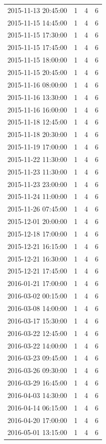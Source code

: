 \begin{tabular}{lrrr}
2015-11-13 20:45:00 & 1 & 4 & 6 \\
2015-11-15 14:45:00 & 1 & 4 & 6 \\
2015-11-15 17:30:00 & 1 & 4 & 6 \\
2015-11-15 17:45:00 & 1 & 4 & 6 \\
2015-11-15 18:00:00 & 1 & 4 & 6 \\
2015-11-15 20:45:00 & 1 & 4 & 6 \\
2015-11-16 08:00:00 & 1 & 4 & 6 \\
2015-11-16 13:30:00 & 1 & 4 & 6 \\
2015-11-16 16:00:00 & 1 & 4 & 6 \\
2015-11-18 12:45:00 & 1 & 4 & 6 \\
2015-11-18 20:30:00 & 1 & 4 & 6 \\
2015-11-19 17:00:00 & 1 & 4 & 6 \\
2015-11-22 11:30:00 & 1 & 4 & 6 \\
2015-11-23 11:30:00 & 1 & 4 & 6 \\
2015-11-23 23:00:00 & 1 & 4 & 6 \\
2015-11-24 11:00:00 & 1 & 4 & 6 \\
2015-11-26 07:45:00 & 1 & 4 & 6 \\
2015-12-01 20:00:00 & 1 & 4 & 6 \\
2015-12-18 17:00:00 & 1 & 4 & 6 \\
2015-12-21 16:15:00 & 1 & 4 & 6 \\
2015-12-21 16:30:00 & 1 & 4 & 6 \\
2015-12-21 17:45:00 & 1 & 4 & 6 \\
2016-01-21 17:00:00 & 1 & 4 & 6 \\
2016-03-02 00:15:00 & 1 & 4 & 6 \\
2016-03-08 14:00:00 & 1 & 4 & 6 \\
2016-03-17 15:30:00 & 1 & 4 & 6 \\
2016-03-22 12:45:00 & 1 & 4 & 6 \\
2016-03-22 14:00:00 & 1 & 4 & 6 \\
2016-03-23 09:45:00 & 1 & 4 & 6 \\
2016-03-26 09:30:00 & 1 & 4 & 6 \\
2016-03-29 16:45:00 & 1 & 4 & 6 \\
2016-04-03 14:30:00 & 1 & 4 & 6 \\
2016-04-14 06:15:00 & 1 & 4 & 6 \\
2016-04-20 17:00:00 & 1 & 4 & 6 \\
2016-05-01 13:15:00 & 1 & 4 & 6 \\

\end{tabular}
